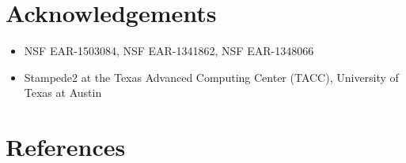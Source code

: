 \documentclass[13pt,aspectratio=169]{beamer}
\begin{document}
\section{Acknowledge\-ments}
\begin{frame}{\secname}
	\begin{itemize}
		\item NSF EAR-1503084, NSF EAR-1341862, NSF EAR-1348066
		\item Stampede2 at the Texas Advanced Computing Center (TACC), University of Texas at Austin
	\end{itemize}
\end{frame}

\section{References}
\begin{frame}[allowframebreaks]{\secname}
	\printbibliography
\end{frame}
\end{document}
